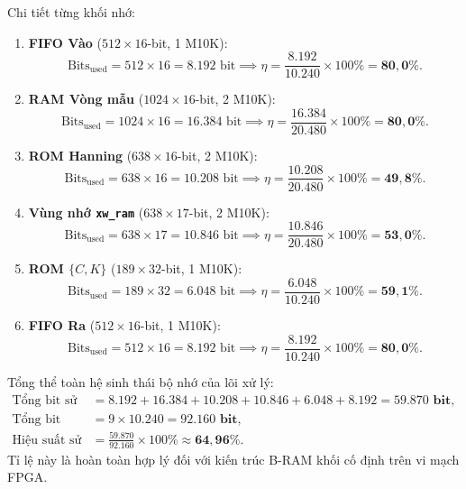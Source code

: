 Chi tiết từng khối nhớ:
\begin{enumerate}
    \item \textbf{FIFO Vào} ($512 \times 16$-bit, 1 M10K):
    \begin{equation}
        \text{Bits}_{\text{used}} = 512 \times 16 = 8.192\text{ bit} \implies \eta = \frac{8.192}{10.240} \times 100\% = \mathbf{80{,}0\%}.
    \end{equation}
    \item \textbf{RAM Vòng mẫu} ($1024 \times 16$-bit, 2 M10K):
    \begin{equation}
        \text{Bits}_{\text{used}} = 1024 \times 16 = 16.384\text{ bit} \implies \eta = \frac{16.384}{20.480} \times 100\% = \mathbf{80{,}0\%}.
    \end{equation}
    \item \textbf{ROM Hanning} ($638 \times 16$-bit, 2 M10K):
    \begin{equation}
        \text{Bits}_{\text{used}} = 638 \times 16 = 10.208\text{ bit} \implies \eta = \frac{10.208}{20.480} \times 100\% = \mathbf{49{,}8\%}.
    \end{equation}
    \item \textbf{Vùng nhớ \texttt{xw\_ram}} ($638 \times 17$-bit, 2 M10K):
    \begin{equation}
        \text{Bits}_{\text{used}} = 638 \times 17 = 10.846\text{ bit} \implies \eta = \frac{10.846}{20.480} \times 100\% = \mathbf{53{,}0\%}.
    \end{equation}
    \item \textbf{ROM $\{C, K\}$} ($189 \times 32$-bit, 1 M10K):
    \begin{equation}
        \text{Bits}_{\text{used}} = 189 \times 32 = 6.048\text{ bit} \implies \eta = \frac{6.048}{10.240} \times 100\% = \mathbf{59{,}1\%}.
    \end{equation}
    \item \textbf{FIFO Ra} ($512 \times 16$-bit, 1 M10K):
    \begin{equation}
        \text{Bits}_{\text{used}} = 512 \times 16 = 8.192\text{ bit} \implies \eta = \frac{8.192}{10.240} \times 100\% = \mathbf{80{,}0\%}.
    \end{equation}
\end{enumerate}

Tổng thể toàn hệ sinh thái bộ nhớ của lõi xử lý:
\begin{align}
    \text{Tổng bit sử dụng} &= 8.192 + 16.384 + 10.208 + 10.846 + 6.048 + 8.192 = \mathbf{59.870\text{ bit}}, \\
    \text{Tổng bit cấp phát} &= 9 \times 10.240 = \mathbf{92.160\text{ bit}}, \\
    \text{Hiệu suất sử dụng trung bình} &= \frac{59.870}{92.160} \times 100\% \approx \mathbf{64{,}96\%}.
\end{align}
Tỉ lệ này là hoàn toàn hợp lý đối với kiến trúc B-RAM khối cố định trên vi mạch FPGA.

